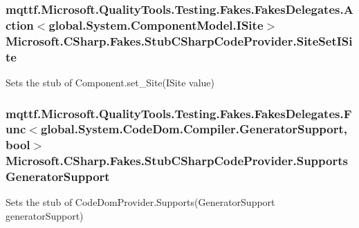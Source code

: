 \hypertarget{class_microsoft_1_1_c_sharp_1_1_fakes_1_1_stub_c_sharp_code_provider_a7212a96ce0c11ac46e36ca7a2af08cc1}{
\subsubsection[{Site\-Set\-I\-Site}]{\setlength{\rightskip}{0pt plus 5cm}mqttf.\-Microsoft.\-Quality\-Tools.\-Testing.\-Fakes.\-Fakes\-Delegates.\-Action$<$global.\-System.\-Component\-Model.\-I\-Site$>$ Microsoft.\-C\-Sharp.\-Fakes.\-Stub\-C\-Sharp\-Code\-Provider.\-Site\-Set\-I\-Site}}\label{class_microsoft_1_1_c_sharp_1_1_fakes_1_1_stub_c_sharp_code_provider_a7212a96ce0c11ac46e36ca7a2af08cc1}


Sets the stub of Component.\-set\-\_\-\-Site(\-I\-Site value)

\hypertarget{class_microsoft_1_1_c_sharp_1_1_fakes_1_1_stub_c_sharp_code_provider_a2136f2fb8e30b9ea895c557f1e4386f2}{
\subsubsection[{Supports\-Generator\-Support}]{\setlength{\rightskip}{0pt plus 5cm}mqttf.\-Microsoft.\-Quality\-Tools.\-Testing.\-Fakes.\-Fakes\-Delegates.\-Func$<$global.\-System.\-Code\-Dom.\-Compiler.\-Generator\-Support, bool$>$ Microsoft.\-C\-Sharp.\-Fakes.\-Stub\-C\-Sharp\-Code\-Provider.\-Supports\-Generator\-Support}}\label{class_microsoft_1_1_c_sharp_1_1_fakes_1_1_stub_c_sharp_code_provider_a2136f2fb8e30b9ea895c557f1e4386f2}


Sets the stub of Code\-Dom\-Provider.\-Supports(\-Generator\-Support generator\-Support)

